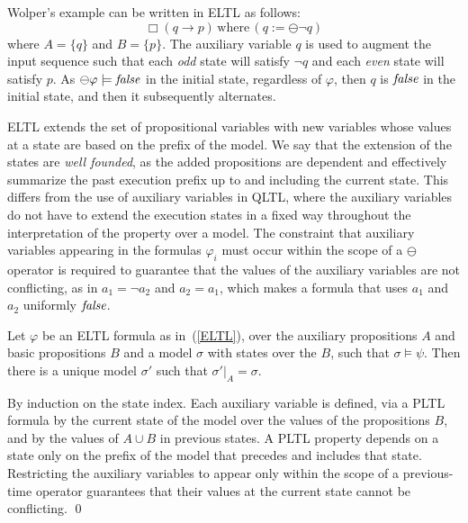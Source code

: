 \noindent
Wolper's example can be written in ELTL
as follows:
\begin{equation} 
\label{form3}
\Box ( q \rightarrow p ) \, \mathrm{where} \, 
 ( q := \ominus \neg q)
\end{equation}
where $A = \{ q\}$ and $B = \{ p \}$.
The auxiliary variable $q$ is used to augment the input sequence such that each {\em odd} state will satisfy $\neg q$
and each {\em even} state will satisfy $p$.  As $\ominus \varphi \models \mathit{false}$ in the initial state, regardless of $\varphi$, then
$q$ is $\mathit{false}$ in the initial state, and then it subsequently alternates.


ELTL extends the set of propositional variables with new variables whose values at a state are
based on the prefix of the model. We say that
the extension of the states are {\em well founded},
as the added propositions are dependent and effectively summarize the past execution prefix up to and
including the current state.
This differs from 
the use of auxiliary variables in QLTL, where the auxiliary variables do not have to extend the execution
states in a fixed way throughout the interpretation of 
the property over a model. The constraint that auxiliary variables appearing in the formulas $\varphi_i$ 
must occur within the scope of a $\ominus$ operator
is required to guarantee that the values
of the auxiliary variables are not conflicting, as in
$a_1 = \neg a_2$ and $a_2 = a_1$, which makes a formula
that uses $a_1$ and $a_2$ uniformly $\mathit{false}$.

\begin{lemma} \label{fourone}
Let $\varphi$ be an ELTL formula as in~(\ref{ELTL}),
over the auxiliary propositions $A$ and basic propositions $B$ 
and a model $\sigma$ with states over the $B$, such that
$\sigma \models \psi$.
Then there is a unique
model $\sigma'$ such that $\sigma' |_A = \sigma$.

\end{lemma}


 By induction on the state index. Each auxiliary variable
is defined, via a PLTL formula by the current state of the model over the values of the propositions $B$, and by the values of $A \cup B$ in previous states. A PLTL
property depends on a state only on the prefix
of the model that precedes and includes that state.
Restricting the auxiliary variables to appear only within the scope of a previous-time operator guarantees that
their values at the current state cannot be conflicting. \qed


